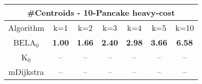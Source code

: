 \begin{tabular}{c|cccccc}\toprule
\multicolumn{7}{c}{#Centroids - 10-Pancake heavy-cost}\\ \midrule
Algorithm & k=1 & k=2 & k=3 & k=4 & k=5 & k=10 \\ \midrule
BELA$_0$ & \textbf{1.00} & \textbf{1.66} & \textbf{2.40} & \textbf{2.98} & \textbf{3.66} & \textbf{6.58} \\
K$_0$ & -- & -- & -- & -- & -- & -- \\
mDijkstra & -- & -- & -- & -- & -- & -- \\ \bottomrule 
\end{tabular}
